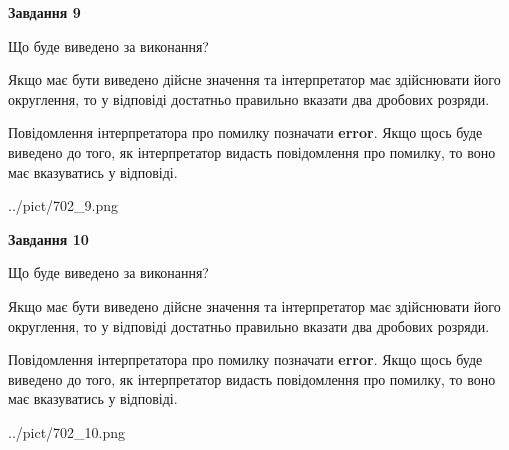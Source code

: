 \documentclass[12pt, ukrainian]{article}
\begin{document}
{\begin {Large}
{\begin {center}\textbf{Завдання 9}\end {center}}\par
Що буде виведено за виконання? \par

Якщо має бути виведено дійсне значення та інтерпретатор має здійснювати його округлення, 
то у відповіді достатньо правильно вказати два дробових розряди.

Повідомлення інтерпретатора про помилку позначати \textbf{error}.
Якщо щось буде виведено до того, як інтерпретатор видасть повідомлення про помилку, 
то воно має вказуватись у відповіді. \par

\begin{center}
	{../pict/702_9.png}
\end{center}
\newpage

{\begin {center}\textbf{Завдання 10}\end {center}}\par
Що буде виведено за виконання? \par

Якщо має бути виведено дійсне значення та інтерпретатор має здійснювати його округлення, 
то у відповіді достатньо правильно вказати два дробових розряди.

Повідомлення інтерпретатора про помилку позначати \textbf{error}.
Якщо щось буде виведено до того, як інтерпретатор видасть повідомлення про помилку, 
то воно має вказуватись у відповіді. \par

\begin{center}
	{../pict/702_10.png}
\end{center}
\newpage

\end {Large}}
\end{document}
